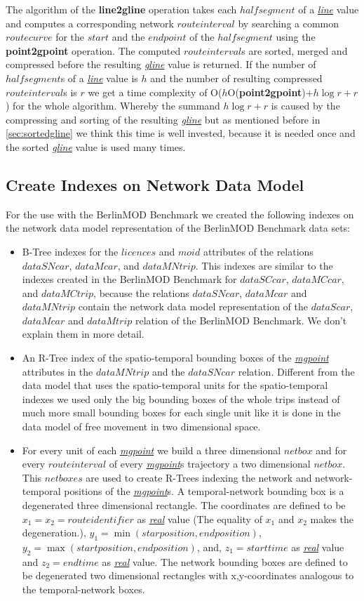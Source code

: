 \documentclass[a4paper]{article}
\newcommand{\bmodb} {BerlinMOD Benchmark}
\newcommand{\op}[1]{\textbf{#1}}
\newcommand{\dt}[1]{\textsl{\underline{#1}}}
\begin{document}
{The algorithm of the \op{line2gline} operation takes each $half segment$ of a
\dt{line} value and computes a corresponding network $route interval$ by
searching a common $route curve$ for the $start$ and the $end point$ of the
$half segment$ using the \op{point2gpoint} operation. The computed
$route interval$s are sorted, merged and compressed before the resulting
\dt{gline} value is returned. If the number of $half segment$s of a \dt{line}
value is $h$ and the number of resulting compressed $route interval$s is $r$
we get a time complexity of O($h$O(\op{point2gpoint})$+ h \log r + r$) for the
whole algorithm. Whereby the summand $h \log r + r$ is caused by the compressing
and sorting of the resulting \dt{gline} but as mentioned before
in \ref{sec:sortedgline} we think this time is well invested, because it is needed
once and the sorted \dt{gline} value is used many times.
\subsection{Create Indexes on Network Data Model}
\label{sec:createIndex}
For the use with the \bmodb{} we created the following indexes on the network
data model representation of the \bmodb{} data sets:
\begin{itemize}
  \item B-Tree indexes for the $licences$ and $moid$ attributes of the relations
$dataSNcar$, $dataMcar$, and $dataMNtrip$. This indexes are similar to the indexes
created in the \bmodb{} for $dataSCcar$, $dataMCcar$, and $dataMCtrip$, because
the relations $dataSNcar$, $dataMcar$ and $dataMNtrip$ contain the network
data model representation of the $dataScar$, $dataMcar$ and $dataMtrip$ relation
of the \bmodb{}. We don't explain them in more detail.
  \item An R-Tree index of the spatio-temporal bounding boxes of the \dt{mgpoint}
attributes in the $dataMNtrip$ and the $dataSNcar$ relation. Different from the
data model that uses the spatio-temporal units for the spatio-temporal indexes we
used only the big bounding boxes of the whole trips instead of much more small bounding
boxes for each single unit like it is done in the data model of free movement in
two dimensional space.
 \item For every unit of each \dt{mgpoint} we build a three dimensional $netbox$
and for every $route interval$ of every \dt{mgpoint}s trajectory a two dimensional
$netbox$. This $netboxes$ are used to create R-Trees indexing the network and
network-temporal positions of the \dt{mgpoint}s. A temporal-network bounding box
is a degenerated three dimensional rectangle. The coordinates are defined to be
$x_1 = x_2 = route identifier$ as \dt{real} value (The equality of $x_1$ and
$x_2$ makes the degeneration.), $y_1 = \min (star position, end position)$,
$y_2 = \max (start position, end position)$,
and, $z_1 = start time$ as \dt{real} value and $z_2 = end time$ as \dt{real} value.
The network bounding boxes are defined to be degenerated two dimensional rectangles
with x,y-coordinates analogous to the temporal-network boxes.
\end{itemize}
}
\end{document}
